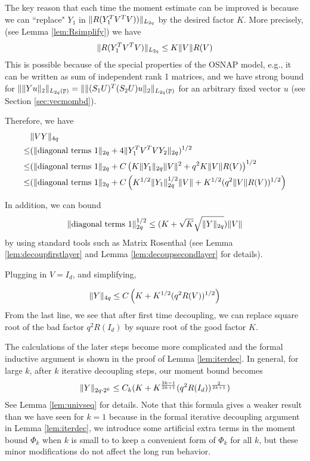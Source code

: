 \documentclass[11pt]{amsart}
\numberwithin{equation}{section}
\numberwithin{equation}{section}
\DeclareMathOperator{\Pb}{\mathbb{P}}
\DeclarePairedDelimiter{\norm}{\lVert}{\rVert}
\begin{document}
The key reason that each time the moment estimate can be improved is because we can ``replace" $Y_1$ in $\norm{R(Y_1^TV^TV))}_{L_{2q}}$ by the desired factor 
$K$. More precisely, (see Lemma \ref{lem:Rsimplify}) we have
\begin{align*}
    \norm{R(Y_1^TV^TV)}_{L_{2q}} \le K \norm{V} R(V)
\end{align*}
This is possible because of the special properties of the OSNAP model, e.g., it can be written as sum of independent rank 1 matrices, and we have strong bound for $\norm{\norm{Yu}_2}_{L_{2q}(\Pb)}=\norm{\norm{(S_1 U)^T(S_2 U)u}_2}_{L_{2q}(\Pb)}$ for an arbitrary fixed vector $u$ (see Section \ref{sec:vecmombd}). 

Therefore, we have
\begin{align*}
&\norm{VY}_{4q}\\\le & (\norm{\text{diagonal terms 1}}_{2q}+4\norm{Y_1^TV^TVY_2}_{2q})^{1/2}
\\\le & (\norm{\text{diagonal terms 1}}_{2q}+C \left( K\norm{Y_1}_{2q}\norm{V}^2+ q^{2}K \norm{V} R(V)\right)^{1/2}
\\\le & (\norm{\text{diagonal terms 1}}_{2q}+C \left( K^{1/2}\norm{Y_1}_{2q}^{1/2}\norm{V}+ K^{1/2}(q^{2} \norm{V} R(V))^{1/2}\right)
\end{align*}

In addition, we can bound
\begin{align*}
    \norm{\text{diagonal terms 1}}_{2q}^{1/2} \le (K+\sqrt{K}\sqrt{\norm{Y}_{2q}}) \norm{V}
\end{align*}
by using standard tools such as Matrix Rosenthal (see Lemma \ref{lem:decoupfirstlayer} and Lemma \ref{lem:decoupsecondlayer} for details).

Plugging in $V=I_d$, and simplifying, 


\begin{align*}
\norm{Y}_{4q} \le 
C\left( K+K^{1/2}(q^{2}  R(V))^{1/2} \right)
\end{align*}
From the last line, we see that after first time decoupling, we can replace square root of the bad factor $q^{2}R(I_d)$ by square root of the good factor $K$.


The calculations of the later steps become more complicated and the formal inductive argument is shown in the proof of Lemma \ref{lem:iterdec}. In general, for large $k$, after $k$ iterative decoupling steps, our moment bound becomes
\begin{align*}
    \norm{Y}_{2q \cdot 2^k} \le C_k(K+K^{\frac{2k-1}{2k+1}}(q^{2}R(I_d))^{\frac{2}{2k+1}})
\end{align*}
See Lemma \ref{lem:univseq} for details. Note that this formula gives a weaker result than we have seen for $k=1$ because in the formal iterative decoupling argument in Lemma \ref{lem:iterdec}, we introduce some artificial extra terms in the moment bound $\Phi_k$ when $k$ is small to  to keep a convenient form of $\Phi_k$ for all $k$, but these minor modifications do not affect the long run behavior.
\end{document}
